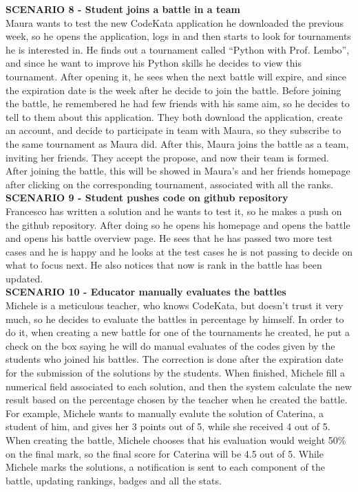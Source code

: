     \textbf{SCENARIO 8 - Student joins a battle in a team}\\
    Maura wants to test the new CodeKata application he downloaded the previous week, so he opens the application, logs in and then starts to look for tournaments he is interested in. He finds out a tournament called ``Python with Prof. Lembo'', and since he want to improve his Python skills he decides to view this tournament.
    After opening it, he sees when the next battle will expire, and since the expiration date is the week after he decide to join the battle. Before joining the battle, he remembered he had few friends with his same aim, so he decides to tell to them about this application. 
    They both download the application, create an account, and decide to participate in team with Maura, so they subscribe to the same tournament as Maura did. 
    After this, Maura joins the battle as a team, inviting her friends. They accept the propose, and now their team is formed.
    After joining the battle, this will be showed in Maura's and her friends homepage after clicking on the corresponding tournament, associated with all the ranks. \\


    \textbf{SCENARIO 9 - Student pushes code on github repository}\\
    Francesco has written a solution and he wants to test it, so he makes a push on the github repository. After doing so he opens his homepage and opens the battle and opens his battle overview page. He sees that he has passed two more test cases and he is happy and he looks at the test cases he is not passing to decide on what to focus next. He also notices that now is rank in the battle has been updated. \\


    \textbf{SCENARIO 10 - Educator manually evaluates the battles}\\
    Michele is a meticulous teacher, who knows CodeKata, but doesn't trust it very much, so he decides to evaluate the battles in percentage by himself. In order to do it, when creating a new battle for one of the tournaments he created, he put a check on the box saying he will do manual evaluates of the codes given by the students who joined his battles.
    The correction is done after the expiration date for the submission of the solutions by the students. When finished, Michele fill a numerical field associated to each solution, and then the system calculate the new result based on the percentage chosen by the teacher when he created the battle. 
    For example, Michele wants to manually evalute the solution of Caterina, a student of him, and gives her 3 points out of 5, while she received 4 out of 5. When creating the battle, Michele chooses that his evaluation would weight 50\% on the final mark, so the final score for Caterina will be 4.5 out of 5.
    While Michele marks the solutions, a notification is sent to each component of the battle, updating rankings, badges and all the stats.\\

